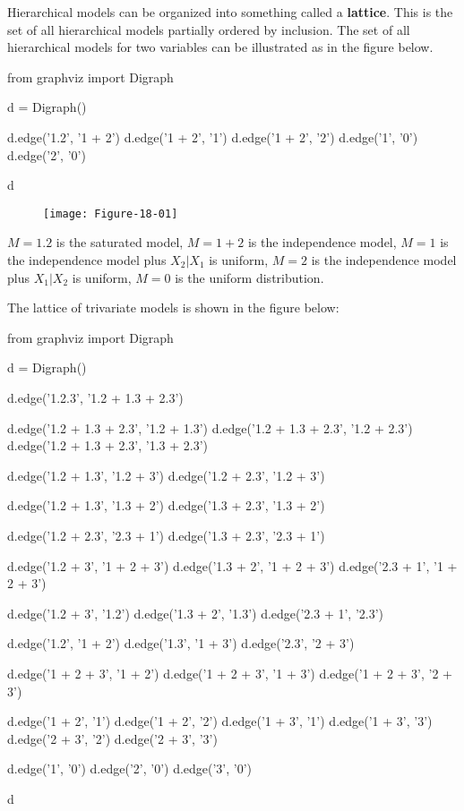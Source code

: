 Hierarchical models can be organized into something called a
\textbf{lattice}. This is the set of all hierarchical models partially
ordered by inclusion. The set of all hierarchical models for two
variables can be illustrated as in the figure below.

\begin{python}
from graphviz import Digraph

d = Digraph()

d.edge('1.2', '1 + 2')
d.edge('1 + 2', '1')
d.edge('1 + 2', '2')
d.edge('1', '0')
d.edge('2', '0')

d
\end{python}
 
\begin{figure}[H]
\texttt{[image: Figure-18-01]}
\end{figure}

\(M = 1.2\) is the saturated model, \(M = 1 + 2\) is the independence
model, \(M = 1\) is the independence model plus \(X_2 | X_1\) is
uniform, \(M = 2\) is the independence model plus \(X_1 | X_2\) is
uniform, \(M = 0\) is the uniform distribution.

The lattice of trivariate models is shown in the figure below:

\begin{python}
from graphviz import Digraph

d = Digraph()

d.edge('1.2.3', '1.2 + 1.3 + 2.3')

d.edge('1.2 + 1.3 + 2.3', '1.2 + 1.3')
d.edge('1.2 + 1.3 + 2.3', '1.2 + 2.3')
d.edge('1.2 + 1.3 + 2.3', '1.3 + 2.3')

d.edge('1.2 + 1.3', '1.2 + 3')
d.edge('1.2 + 2.3', '1.2 + 3')

d.edge('1.2 + 1.3', '1.3 + 2')
d.edge('1.3 + 2.3', '1.3 + 2')

d.edge('1.2 + 2.3', '2.3 + 1')
d.edge('1.3 + 2.3', '2.3 + 1')

d.edge('1.2 + 3', '1 + 2 + 3')
d.edge('1.3 + 2', '1 + 2 + 3')
d.edge('2.3 + 1', '1 + 2 + 3')

d.edge('1.2 + 3', '1.2')
d.edge('1.3 + 2', '1.3')
d.edge('2.3 + 1', '2.3')

d.edge('1.2', '1 + 2')
d.edge('1.3', '1 + 3')
d.edge('2.3', '2 + 3')

d.edge('1 + 2 + 3', '1 + 2')
d.edge('1 + 2 + 3', '1 + 3')
d.edge('1 + 2 + 3', '2 + 3')

d.edge('1 + 2', '1')
d.edge('1 + 2', '2')
d.edge('1 + 3', '1')
d.edge('1 + 3', '3')
d.edge('2 + 3', '2')
d.edge('2 + 3', '3')

d.edge('1', '0')
d.edge('2', '0')
d.edge('3', '0')

d
\end{python}
 
